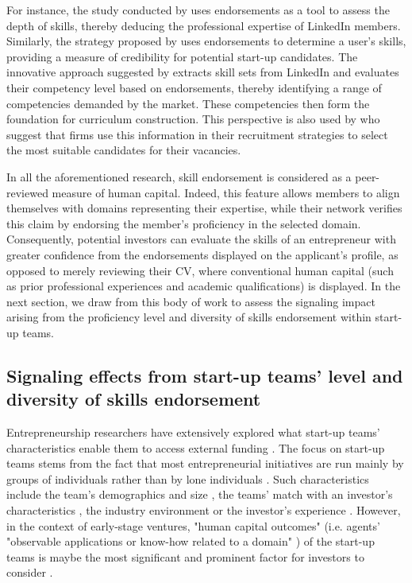 \documentclass[12pt]{article}
\begin{document}
For instance, the study conducted by \citep{yan2019social} uses endorsements as a tool to assess the depth of skills, thereby deducing the professional expertise of LinkedIn members. Similarly, the strategy proposed by \citep{drakopoulos2020building} uses endorsements to determine a user's skills, providing a measure of credibility for potential start-up candidates. The innovative approach suggested by \citep{constantinov2015preliminary} extracts skill sets from LinkedIn and evaluates their competency level based on endorsements, thereby identifying a range of competencies demanded by the market. These competencies then form the foundation for curriculum construction. This perspective is also used by \citet{wu2018analysis} who suggest that firms use this information in their recruitment strategies to select the most suitable candidates for their vacancies.

In all the aforementioned research, skill endorsement is considered as a peer-reviewed measure of human capital. Indeed, this feature allows members to align themselves with domains representing their expertise, while their network verifies this claim by endorsing the member's proficiency in the selected domain. Consequently, potential investors can evaluate the skills of an entrepreneur with greater confidence from the endorsements displayed on the applicant's profile, as opposed to merely reviewing their CV, where conventional human capital (such as prior professional experiences and academic qualifications) is displayed. In the next section, we draw from this body of work to assess the signaling impact arising from the proficiency level and diversity of skills endorsement within start-up teams.

\subsection{Signaling effects from start-up teams' level and diversity of skills endorsement}

Entrepreneurship researchers have extensively explored what start-up teams' characteristics enable them to access external funding \citep{roure1990predictors}. The focus on start-up teams stems from the fact that most entrepreneurial initiatives are run mainly by groups of individuals rather than by lone individuals \citep{klotz2014new}. Such characteristics include the team's demographics and size \citep{eisenhardt1990organizational}, the teams' match with an investor's characteristics \citep{aggarwal2015evaluating}, the industry environment \citep{townsend2015turning} or the investor's experience \citep{franke2008venture}. However, in the context of early-stage ventures, "human capital outcomes" (i.e. agents’ "observable applications or know-how related to a domain" \citep{becker1964human, marvel2016human}) of the start-up teams is maybe the most significant and prominent factor for investors to consider \citep{beckman2007early, ko2018signaling, matusik2008values}.
\end{document}
